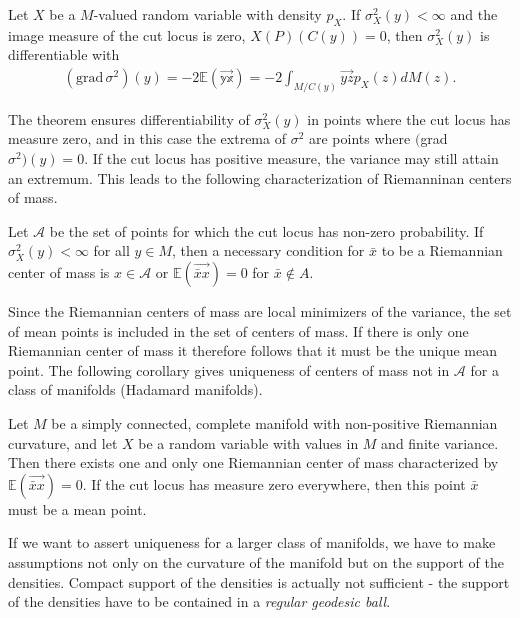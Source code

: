 \begin{theorem}
Let $X$ be a $M$-valued random variable with density $p_X$. If $\sigma^2_X(y) < \infty$ and the image measure of the cut locus is zero, $X(P)(C(y)) = 0$, then $\sigma^2_X(y)$ is differentiable with
\begin{align*}
(\mathrm{grad} \, \sigma^2) (y) = -2 \mathbb{E(\overrightarrow{yx})} = - 2 \int_{M/C(y)} \overrightarrow{yz} p_X(z) d M(z).
\end{align*}
\end{theorem}
The theorem ensures differentiability of $\sigma^2_X(y)$ in points where the cut locus has measure zero, and in this case the extrema of $\sigma^2$ are points where $($grad $\sigma^2) (y) = 0$. If the cut locus has positive measure, the variance may still attain an extremum. This leads to the following characterization of Riemanninan centers of mass.

\begin{corollary}
Let $\mathcal{A}$ be the set of points for which the cut locus has non-zero probability. If $\sigma^2_X(y) < \infty$ for all $y \in M$, then a necessary condition for $\bar{x}$ to be a Riemannian center of mass is $x \in \mathcal{A}$ or $\mathbb{E}(\overrightarrow{\bar{x}x}) = 0$ for $\bar{x} \notin A$.
\end{corollary}
Since the Riemannian centers of mass are local minimizers of the variance, the set of mean points is included in the set of centers of mass. If there is only one Riemannian center of mass it therefore follows that it must be the unique mean point. The following corollary gives uniqueness of centers of mass not in $\mathcal{A}$ for a class of manifolds (Hadamard manifolds).

\begin{corollary}
Let $M$ be a simply connected, complete manifold with non-positive Riemannian curvature, and let $X$ be a random variable with values in $M$ and finite variance. Then there exists one and only one Riemannian center of mass characterized by $\mathbb{E}(\overrightarrow{\bar{x}x}) = 0$. If the cut locus has measure zero everywhere, then this point $\bar{x}$ must be a mean point.
\end{corollary}
If we want to assert uniqueness for a larger class of manifolds, we have to make assumptions not only on the curvature of the manifold but on the support of the densities. Compact support of the densities is actually not sufficient - the support of the densities have to be contained in a \textit{regular geodesic ball}.

